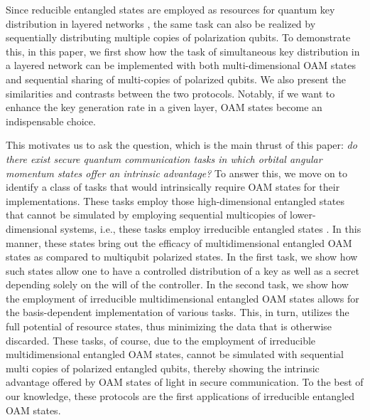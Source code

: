 \documentclass[fleqn,10pt]{wlscirep}
\begin{document}
Since reducible entangled states are employed as resources for quantum key distribution in layered networks \cite{pivoluska2018layered}, the same task can also be realized by sequentially distributing multiple copies of polarization qubits. To demonstrate this, in this paper, we first show how the task of simultaneous key distribution in a layered network can be implemented with both multi-dimensional OAM states and sequential sharing of  multi-copies of polarized qubits. We also present the similarities and contrasts between the two protocols. Notably, if we want to enhance the key generation rate in a given layer, OAM states become an indispensable choice.

This motivates us to ask the question, which is the main thrust of this paper: {\it do there exist secure quantum communication tasks in which orbital angular momentum states offer an intrinsic advantage?} To answer this, we move on to identify a class of tasks that would intrinsically require OAM states for their implementations. These tasks employ those high-dimensional entangled states that cannot be simulated by employing sequential multicopies of lower-dimensional systems, i.e., these tasks employ irreducible entangled states \cite{kraft2018characterizing,guo2020measurement,sun2020experimental}. In this manner, these states bring out the efficacy of multidimensional entangled OAM states as compared to multiqubit polarized states. In the first task, we show how such states allow one to have a controlled distribution of a key as well as a secret depending solely on the will of the controller. In the second task, we show how the employment of irreducible multidimensional entangled OAM states allows for the basis-dependent implementation of various tasks. This, in turn, utilizes the full potential of resource states, thus minimizing the data that is otherwise discarded. These tasks, of course, due to the employment of irreducible multidimensional entangled OAM states,  cannot be simulated with sequential multi copies of polarized entangled qubits, thereby showing the intrinsic advantage offered by OAM states of light in secure communication.  To the best of our knowledge, these protocols are the first applications of irreducible entangled OAM states.
\end{document}
